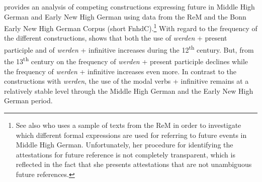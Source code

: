 \documentclass[output=paper,colorlinks,citecolor=brown]{langscibook}
\begin{document}
\citet{Hartmann2021} provides an analysis of competing constructions expressing future in Middle High German and Early New High German using data from the ReM and the Bonn Early New High German Corpus (short FnhdC).\footnote{See also \citet{Luther2013} who uses a sample of texts from the ReM in order to investigate which different formal expressions are used for referring to future events in Middle High German. Unfortunately, her procedure for identifying the attestations for future reference is not completely transparent, which is reflected in the fact that she presents attestations that are not unambiguous future references.} With regard to the frequency of the different constructions, \citet[376--378]{Hartmann2021} shows that both the use of \textit{werden} + present participle and of \textit{werden} + infinitive increases during the 12\textsuperscript{th} century. But, from the 13\textsuperscript{th} century on the frequency of \textit{werden} + present participle declines while the frequency of \textit{werden} + infinitive increases even more. In contrast to the constructions with \textit{werden}, the use of the modal verbs + infinitive remains at a relatively stable level through the Middle High German and the Early New High German period.
\end{document}
